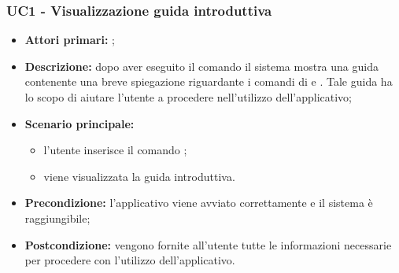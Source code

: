 \subsubsection{UC1 - Visualizzazione guida introduttiva}
	\begin{itemize}
		\item \textbf{Attori primari:} \ug{};
		\item \textbf{Descrizione:} dopo aver eseguito il comando \init{} il sistema mostra una guida contenente una breve spiegazione riguardante i comandi di \login{} e \signup{}. Tale guida ha lo scopo di aiutare l'utente a procedere nell'utilizzo dell'applicativo; 
		\item \textbf{Scenario principale:} 
		\begin{itemize}
			\item l’utente inserisce il comando \init{};
			\item viene visualizzata la guida introduttiva.
		\end{itemize}
		\item \textbf{Precondizione:} l'applicativo viene avviato correttamente e il sistema è raggiungibile;
		\item \textbf{Postcondizione:} vengono fornite all'utente tutte le informazioni necessarie per procedere con l'utilizzo dell'applicativo. 
	\end{itemize}